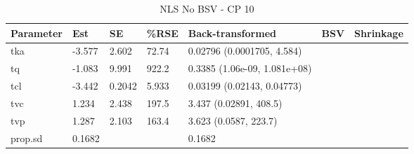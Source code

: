 \begin{table}
\centering\centering
\caption{NLS No BSV - CP 10}
\centering
\fontsize{8}{10}\selectfont
\begin{tabular}[t]{lllllll}
\toprule
\textbf{Parameter} & \textbf{Est} & \textbf{SE} & \textbf{\%RSE} & \textbf{Back-transformed} & \textbf{BSV} & \textbf{Shrinkage}\\
\midrule
tka & -3.577 & 2.602 & 72.74 & 0.02796 (0.0001705, 4.584) &  & \\
\midrule
tq & -1.083 & 9.991 & 922.2 & 0.3385 (1.06e-09, 1.081e+08) &  & \\
\midrule
tcl & -3.442 & 0.2042 & 5.933 & 0.03199 (0.02143, 0.04773) &  & \\
\midrule
tvc & 1.234 & 2.438 & 197.5 & 3.437 (0.02891, 408.5) &  & \\
\midrule
tvp & 1.287 & 2.103 & 163.4 & 3.623 (0.0587, 223.7) &  & \\
\midrule
prop.sd & 0.1682 &  &  & 0.1682 &  & \\
\bottomrule
\end{tabular}
\end{table}